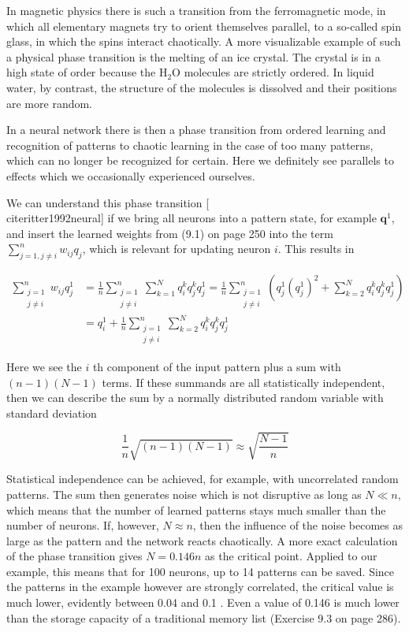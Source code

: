 \documentclass[10pt]{book}
\begin{document}
In magnetic physics there is such a transition from the ferromagnetic mode, in which all elementary magnets try to orient themselves parallel, to a so-called spin glass, in which the spins interact chaotically. A more visualizable example of such a physical phase transition is the melting of an ice crystal. The crystal is in a high state of order because the $\mathrm{H}_{2} \mathrm{O}$ molecules are strictly ordered. In liquid water, by contrast, the structure of the molecules is dissolved and their positions are more random.

In a neural network there is then a phase transition from ordered learning and recognition of patterns to chaotic learning in the case of too many patterns, which can no longer be recognized for certain. Here we definitely see parallels to effects which we occasionally experienced ourselves.

We can understand this phase transition [\\cite{ritter1992neural}] if we bring all neurons into a pattern state, for example $\boldsymbol{q}^{1}$, and insert the learned weights from (9.1) on page 250 into the term $\sum_{j=1, j \neq i}^{n} w_{i j} q_{j}$, which is relevant for updating neuron $i$. This results in

$$
\begin{aligned}
\sum_{\substack{j=1 \\
j \neq i}}^{n} w_{i j} q_{j}^{1} & =\frac{1}{n} \sum_{\substack{j=1 \\
j \neq i}}^{n} \sum_{k=1}^{N} q_{i}^{k} q_{j}^{k} q_{j}^{1}=\frac{1}{n} \sum_{\substack{j=1 \\
j \neq i}}^{n}\left(q_{j}^{1}\left(q_{j}^{1}\right)^{2}+\sum_{k=2}^{N} q_{i}^{k} q_{j}^{k} q_{j}^{1}\right) \\
& =q_{i}^{1}+\frac{1}{n} \sum_{\substack{j=1 \\
j \neq i}}^{n} \sum_{k=2}^{N} q_{i}^{k} q_{j}^{k} q_{j}^{1}
\end{aligned}
$$

Here we see the $i$ th component of the input pattern plus a sum with $(n-1)(N-1)$ terms. If these summands are all statistically independent, then we can describe the sum by a normally distributed random variable with standard deviation


$$
\frac{1}{n} \sqrt{(n-1)(N-1)} \approx \sqrt{\frac{N-1}{n}}
$$

Statistical independence can be achieved, for example, with uncorrelated random patterns. The sum then generates noise which is not disruptive as long as $N \ll n$, which means that the number of learned patterns stays much smaller than the number of neurons. If, however, $N \approx n$, then the influence of the noise becomes as large as the pattern and the network reacts chaotically. A more exact calculation of the phase transition gives $N=0.146 n$ as the critical point. Applied to our example, this means that for 100 neurons, up to 14 patterns can be saved. Since the patterns in the example however are strongly correlated, the critical value is much lower, evidently between 0.04 and 0.1 . Even a value of 0.146 is much lower than the storage capacity of a traditional memory list (Exercise 9.3 on page 286).
\end{document}
